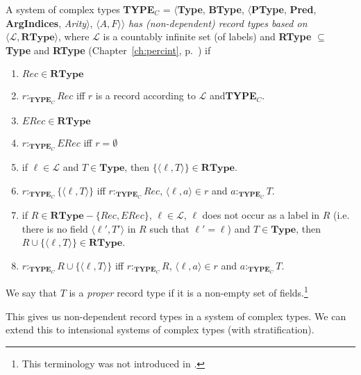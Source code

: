 A system of complex types \textbf{TYPE}$_C$ = $\langle${\bf Type}, {\bf BType},
$\langle$\textbf{PType}, {\bf Pred}, \textbf{ArgIndices}, {\it
  Arity\/}$\rangle$, $\langle A,F\rangle$$\rangle$ \textit{has
  (non-dependent) record
  types based on $\langle \mathcal{L}, \mathbf{RType}\rangle$},
 where $\mathcal{L}$ is a countably infinite set (of labels)
and \textbf{RType} $\subseteq$ \textbf{Type} and \textbf{RType}
(Chapter~\ref{ch:percint}, p.~\pageref{ex:ndrectypes}) if
\begin{enumerate} 
 
\item $\mathit{Rec}\in\mathbf{RType}$

\item $r:_{\mathbf{TYPE}_C}\mathit{Rec}$ iff $r$ is a record according
  to $\mathcal{L}$ and\textbf{TYPE$_C$}.

\item $\mathit{ERec}\in\mathbf{RType}$

\item $r:_{\mathbf{TYPE}_C}\mathit{ERec}$ iff $r=\emptyset$

\item if $\ell\in\mathcal{L}$ and $T\in\mathbf{Type}$, then
  $\{\langle\ell,T\rangle\}\in\mathbf{RType}$.

\item $r:_{\mathbf{TYPE}_C}\{\langle\ell,T\rangle\}$ iff
  $r:_{\mathbf{TYPE}_C}\mathit{Rec}$, $\langle\ell,a\rangle\in r$ and
  $a:_{\mathbf{TYPE}_C}T$.

\item if $R\in\mathbf{RType}-\{\mathit{Rec},\mathit{ERec}\}$, $\ell\in\mathcal{L}$, $\ell$ does not occur as a
  label in $R$ (i.e. there is no field $\langle\ell',T'\rangle$ in $R$
  such that $\ell'=\ell$) and $T\in\mathbf{Type}$, then
  $R\cup\{\langle\ell,T\rangle\}\in\mathbf{RType}$.\label{cl:ndrectype-emb}

\item $r:_{\mathbf{TYPE}_C}R\cup\{\langle\ell,T\rangle\}$ iff
  $r:_{\mathbf{TYPE}_C}R$, $\langle\ell,a\rangle\in r$ and $a:_{\mathbf{TYPE}_C}T$.
 
\end{enumerate}

We say that $T$ is a \textit{proper} record type if it is a non-empty
set of fields.\footnote{This terminology was not introduced in \cite{Cooper2012}.}\label{pg:proprectype} 

This gives us non-dependent record types in a system of complex types.
We can extend this to intensional systems of complex types (with
stratification).  

